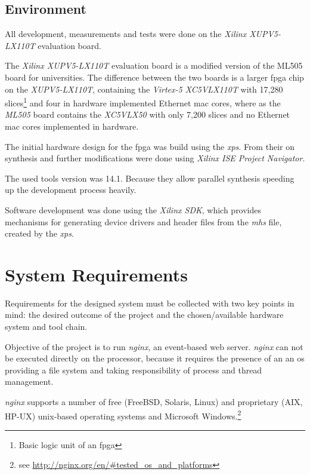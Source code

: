 \section{Environment}

All development, measurements and tests were done on the \textit{Xilinx XUPV5-LX110T} evaluation board.

The \textit{Xilinx XUPV5-LX110T} evaluation board is a modified version of the ML505 board for universities\cite{xupv5manual}. The difference between the two boards is a larger \gls{fpga} chip on the \textit{XUPV5-LX110T}, containing the \textit{Virtex-5 XC5VLX110T} with 17,280 slices\footnote{Basic logic unit of an \gls{fpga}\cite{fpga_ni}} and four in hardware implemented Ethernet \gls{mac} cores, where as the \textit{ML505} board contains the \textit{XC5VLX50} with only 7,200 slices and no Ethernet \gls{mac} cores implemented in hardware.

The initial hardware design for the \gls{fpga} was build using the \textit{\gls{xps}}. From their on synthesis and further modifications were done using \textit{Xilinx ISE Project Navigator}.

The used tools version was 14.1. Because they allow parallel synthesis speeding up the development process heavily.

Software development was done using the \textit{Xilinx SDK}, which provides mechanisms for generating device drivers and header files from the \textit{\gls{mhs}} file, created by the \textit{\gls{xps}}.

\chapter{System Requirements}

Requirements for the designed system must be collected with two key points in mind: the desired outcome of the project and the chosen/available hardware system and tool chain.

Objective of the project is to run \textit{nginx}, an event-based web server. \textit{nginx} can not be executed directly on the processor, because it requires the presence of an an \gls{os} providing a file system and taking responsibility of process and thread management. 

\textit{nginx} supports a number of free (FreeBSD, Solaris, Linux) and proprietary (AIX, HP-UX) unix-based operating systems and Microsoft Windows.\footnote{see \url{http://nginx.org/en/\#tested_os_and_platforms}}

